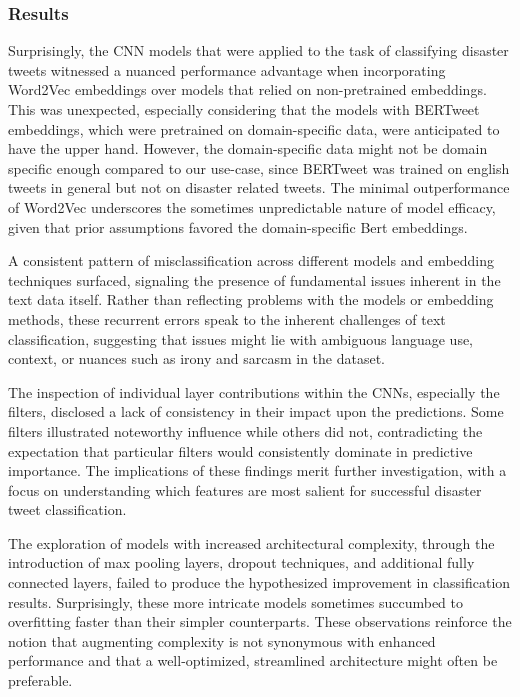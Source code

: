 \documentclass[10pt,table]{article}
\begin{document}
\subsubsection{Results}
Surprisingly, the CNN models that were applied to the task of classifying disaster tweets witnessed a nuanced performance advantage when incorporating Word2Vec embeddings over models that relied on non-pretrained embeddings. This was unexpected, especially considering that the models with BERTweet embeddings, which were pretrained on domain-specific data, were anticipated to have the upper hand. However, the domain-specific data might not be domain specific enough compared to our use-case, since BERTweet was trained on english tweets in general but not on disaster related tweets. The minimal outperformance of Word2Vec underscores the sometimes unpredictable nature of model efficacy, given that prior assumptions favored the domain-specific Bert embeddings.

A consistent pattern of misclassification across different models and embedding techniques surfaced, signaling the presence of fundamental issues inherent in the text data itself. Rather than reflecting problems with the models or embedding methods, these recurrent errors speak to the inherent challenges of text classification, suggesting that issues might lie with ambiguous language use, context, or nuances such as irony and sarcasm in the dataset.

The inspection of individual layer contributions within the CNNs, especially the filters, disclosed a lack of consistency in their impact upon the predictions. Some filters illustrated noteworthy influence while others did not, contradicting the expectation that particular filters would consistently dominate in predictive importance. The implications of these findings merit further investigation, with a focus on understanding which features are most salient for successful disaster tweet classification.

The exploration of models with increased architectural complexity, through the introduction of max pooling layers, dropout techniques, and additional fully connected layers, failed to produce the hypothesized improvement in classification results. Surprisingly, these more intricate models sometimes succumbed to overfitting faster than their simpler counterparts. These observations reinforce the notion that augmenting complexity is not synonymous with enhanced performance and that a well-optimized, streamlined architecture might often be preferable.
\end{document}
